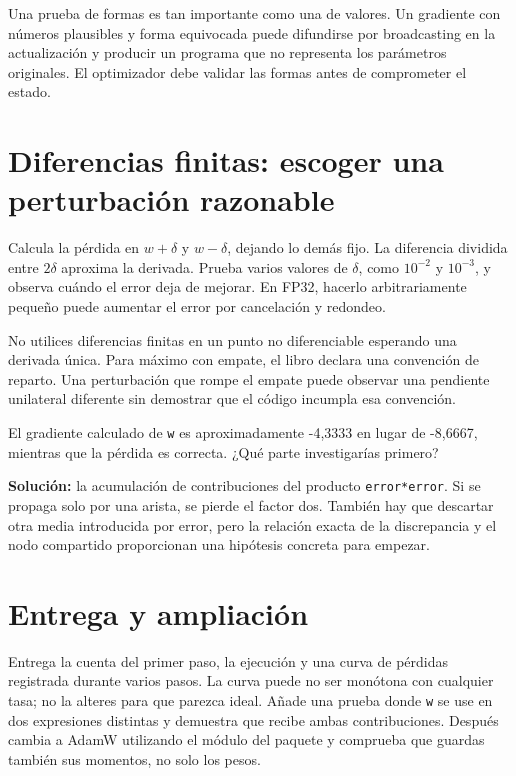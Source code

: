 \documentclass[12pt,a4paper,oneside]{report}
\begin{document}
Una prueba de formas es tan importante como una de valores. Un gradiente con números plausibles y forma equivocada puede difundirse por broadcasting en la actualización y producir un programa que no representa los parámetros originales. El optimizador debe validar las formas antes de comprometer el estado.

\section{Diferencias finitas: escoger una perturbación razonable}
Calcula la pérdida en $w+\delta$ y $w-\delta$, dejando lo demás fijo. La diferencia dividida entre $2\delta$ aproxima la derivada. Prueba varios valores de $\delta$, como $10^{-2}$ y $10^{-3}$, y observa cuándo el error deja de mejorar. En FP32, hacerlo arbitrariamente pequeño puede aumentar el error por cancelación y redondeo.

No utilices diferencias finitas en un punto no diferenciable esperando una derivada única. Para máximo con empate, el libro declara una convención de reparto. Una perturbación que rompe el empate puede observar una pendiente unilateral diferente sin demostrar que el código incumpla esa convención.

\begin{practica}
El gradiente calculado de \texttt{w} es aproximadamente -4,3333 en lugar de -8,6667, mientras que la pérdida es correcta. ¿Qué parte investigarías primero?

\textbf{Solución:} la acumulación de contribuciones del producto \texttt{error*error}. Si se propaga solo por una arista, se pierde el factor dos. También hay que descartar otra media introducida por error, pero la relación exacta de la discrepancia y el nodo compartido proporcionan una hipótesis concreta para empezar.

\end{practica}
\section{Entrega y ampliación}
Entrega la cuenta del primer paso, la ejecución y una curva de pérdidas registrada durante varios pasos. La curva puede no ser monótona con cualquier tasa; no la alteres para que parezca ideal. Añade una prueba donde \texttt{w} se use en dos expresiones distintas y demuestra que recibe ambas contribuciones. Después cambia a AdamW utilizando el módulo del paquete y comprueba que guardas también sus momentos, no solo los pesos.
\end{document}
